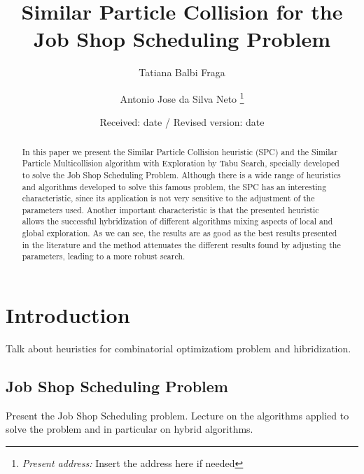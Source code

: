 %
\title{Similar Particle Collision for the Job Shop Scheduling Problem}
\author{Tatiana Balbi Fraga \and Antonio Jose da Silva Neto%
\thanks{\emph{Present address:} Insert the address here if needed}%
}                     %
%
\offprints{}          %
%
%
\date{Received: date / Revised version: date}
%
\maketitle
%
\begin{abstract}
In this paper we present the Similar Particle Collision heuristic (SPC) and the Similar Particle Multicollision algorithm with Exploration by Tabu Search, specially developed to solve the Job Shop Scheduling Problem. Although there is a wide range of heuristics and algorithms developed to solve this famous problem, the SPC has an interesting characteristic, since its application is not very sensitive to the adjustment of the parameters used. Another important characteristic is that the presented heuristic allows the successful hybridization of different algorithms mixing aspects of local and global exploration. As we can see, the results are as good as the best results presented in the literature and the method attenuates the different results found by adjusting the parameters, leading to a more robust search.
\end{abstract}
%
\section{Introduction}
\label{intro}

Talk about heuristics for combinatorial optimizatiom problem and hibridization.

\subsection{Job Shop Scheduling Problem}
\label{sec:JSSP}

Present the Job Shop Scheduling problem. 
Lecture on the algorithms applied to solve the problem and in particular on hybrid algorithms.


